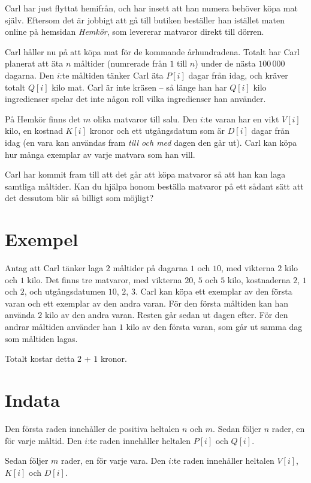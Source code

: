 Carl har just flyttat hemifrån, och har insett att han numera behöver köpa mat själv.
Eftersom det är jobbigt att gå till butiken beställer han istället maten online på hemsidan \emph{Hemkör}, som levererar matvaror direkt till dörren.

Carl håller nu på att köpa mat för de kommande århundradena.
Totalt har Carl planerat att äta $n$ måltider (numrerade från $1$ till $n$) under de nästa $100\,000$ dagarna.
Den $i$:te måltiden tänker Carl äta $P[i]$ dagar från idag, och kräver totalt $Q[i]$ kilo mat.
Carl är inte kräsen -- så länge han har $Q[i]$ kilo ingredienser spelar det inte någon roll vilka ingredienser han använder.

På Hemkör finns det $m$ olika matvaror till salu.
Den $i$:te varan har en vikt $V[i]$ kilo, en kostnad $K[i]$ kronor och ett utgångsdatum som är $D[i]$ dagar från idag (en vara kan användas fram \emph{till och med} dagen den går ut).
Carl kan köpa hur många exemplar av varje matvara som han vill.

Carl har kommit fram till att det går att köpa matvaror så att han kan laga samtliga måltider.
Kan du hjälpa honom beställa matvaror på ett sådant sätt att det dessutom blir så billigt som möjligt?

\section*{Exempel}
Antag att Carl tänker laga $2$ måltider på dagarna $1$ och $10$, med vikterna $2$ kilo och $1$ kilo.
Det finns tre matvaror, med vikterna $20$, $5$ och $5$ kilo, kostnaderna $2$, $1$ och $2$, och utgångsdatumen $10$, $2$, $3$.
Carl kan köpa ett exemplar av den första varan och ett exemplar av den andra varan.
För den första måltiden kan han använda $2$ kilo av den andra varan.
Resten går sedan ut dagen efter.
För den andrar måltiden använder han $1$ kilo av den första varan, som går ut samma dag som måltiden lagas.

Totalt kostar detta $2$ + $1$ kronor.


\section*{Indata}
Den första raden innehåller de positiva heltalen $n$ och $m$.
Sedan följer $n$ rader, en för varje måltid.
Den $i$:te raden innehåller heltalen $P[i]$ och $Q[i]$.

Sedan följer $m$ rader, en för varje vara.
Den $i$:te raden innehåller heltalen $V[i]$, $K[i]$ och $D[i]$.

